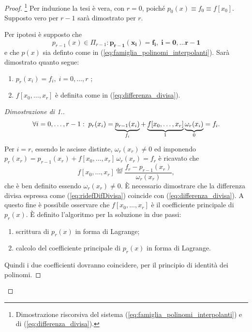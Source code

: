 \begin{proof}
	\footnote{Dimostrazione riscorsiva del sistema (\ref{eq:famiglia_polinomi_interpolanti}) e di (\ref{eq:differenza_divisa}).}
    Per induzione la tesi è vera, con $r=0$, poiché $p_0(x)\equiv f_0\equiv f[x_0]$. Supposto vero per $r-1$ sarà dimostrato per $r$.
    
    \noindent Per ipotesi è supposto che
    \begin{equation*}
        p_{r-1}(x)\in\Pi_{r-1}:\boldsymbol{p_{r-1}(x_i)=f_i,\; i=0,\hdots r-1}
    \end{equation*}
    e che $p(x)$ sia definto come in (\ref{eq:famiglia_polinomi_interpolanti}). Sarà dimostrato quanto segue:
    \begin{enumerate}
        \item $p_r(x_i)=f_i, \; i=0,\hdots,r$ \footnotemark;
        \item $f[x_0, \hdots, x_r]$ è definita come in (\ref{eq:differenza_divisa}).
    \end{enumerate}
    \begin{proof}[Dimostrazione di 1.]
        \begin{equation*}
        \forall i=0,\hdots, r-1:\; p_r(x_i)=\underbrace{p_{r-1}(x_i)}_{f_i}+\underbrace{f[x_0, \hdots, x_r]}_{\footnotemark}\underbrace{\omega_r(x_i)}_{0}=f_i.
        \end{equation*}
        Per $i=r$, essendo le ascisse distinte, $\omega_r(x_r)\neq 0$ ed imponendo $p_r(x_r)=p_{r-1}(x_r)+f[x_0,\hdots,x_r]\,\omega_r(x_r)=f_r$ è ricavato che
        \begin{equation}\label{eq:ridefDifDivisa}
            f[x_0, \hdots, x_r]\overset{\text{def}}{=}\frac{f_r-p_{r-1}(x_r)}{\omega_r(x_r)},
        \end{equation}
        che è ben definito essendo  $\omega_r(x_r)\neq 0$.
        È necessario dimostrare che la differenza divisa espressa come (\ref{eq:ridefDifDivisa}) coincide con (\ref{eq:differenza_divisa}). A questo fine è possibile osservare che $f[x_0, \hdots, x_r]$ è il coefficiente principale di $p_r(x)$.
        È definito l'algoritmo per la soluzione in due passi: 
        \begin{enumerate}
            \item scrittura di $p_r(x)$ in forma di Lagrange;
            \item calcolo del coefficiente principale di $p_r(x)$ in forma di Lagrange.
        \end{enumerate}
        Quindi i due coefficienti dovranno coincidere, per il principio di identità dei polinomi.
    

\end{proof}
\end{proof}

